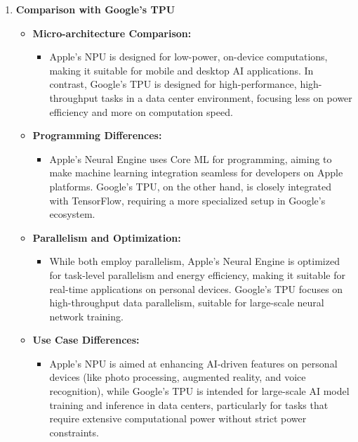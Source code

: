 \documentclass{article}
\begin{document}
\begin{enumerate}[label=\textbf{\arabic*.}]
    \item \textbf{Comparison with Google’s TPU}
    \begin{itemize}
        \item \textbf{Micro-architecture Comparison:}
        \begin{itemize}
            \item Apple's NPU is designed for low-power, on-device computations, making it suitable for mobile and desktop AI applications. In contrast, Google’s TPU is designed for high-performance, high-throughput tasks in a data center environment, focusing less on power efficiency and more on computation speed.
        \end{itemize}
        
        \item \textbf{Programming Differences:}
        \begin{itemize}
            \item Apple's Neural Engine uses Core ML for programming, aiming to make machine learning integration seamless for developers on Apple platforms. Google's TPU, on the other hand, is closely integrated with TensorFlow, requiring a more specialized setup in Google’s ecosystem.
        \end{itemize}
        
        \item \textbf{Parallelism and Optimization:}
        \begin{itemize}
            \item While both employ parallelism, Apple's Neural Engine is optimized for task-level parallelism and energy efficiency, making it suitable for real-time applications on personal devices. Google’s TPU focuses on high-throughput data parallelism, suitable for large-scale neural network training.
        \end{itemize}
        
        \item \textbf{Use Case Differences:}
        \begin{itemize}
            \item Apple's NPU is aimed at enhancing AI-driven features on personal devices (like photo processing, augmented reality, and voice recognition), while Google’s TPU is intended for large-scale AI model training and inference in data centers, particularly for tasks that require extensive computational power without strict power constraints.
        \end{itemize}
    \end{itemize}
\end{enumerate}
\end{document}
